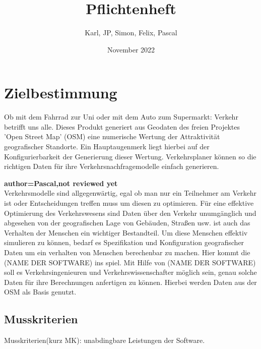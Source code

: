 \documentclass[parskip=full]{scrartcl} %
\title{Pflichtenheft}
\author{Karl, JP, Simon, Felix, Pascal}
\date{November 2022}
\begin{document}
\maketitle
\newpage

\tableofcontents
\newpage




\section{Zielbestimmung}
Ob mit dem Fahrrad zur Uni oder mit dem Auto zum Supermarkt: Verkehr betrifft uns alle. Dieses Produkt generiert aus Geodaten des freien Projektes 'Open Street Map' (OSM) eine numerische Wertung der Attraktivität geografischer Standorte. Ein Hauptaugenmerk liegt hierbei auf der Konfigurierbarkeit der Generierung dieser Wertung. Verkehrsplaner können so die richtigen Daten für ihre Verkehrsnachfragemodelle einfach generieren.


\textbf{author=Pascal,not reviewed yet\\}
Verkehrsmodelle sind allgegenwärtig, egal ob man nur ein Teilnehmer am Verkehr ist oder Entscheidungen treffen muss um diesen zu optimieren.
Für eine effektive Optimierung des Verkehrswesens sind Daten über den Verkehr unumgänglich und abgesehen von der geografischen Lage von Gebäuden, Straßen usw. ist auch das Verhalten der Menschen ein wichtiger Bestandteil.
Um diese Menschen effektiv simulieren zu können, bedarf es Spezifikation und Konfiguration geografischer Daten um ein verhalten von Menschen berechenbar zu machen.
Hier kommt die (NAME DER SOFTWARE) ins spiel.
Mit Hilfe von (NAME DER SOFTWARE) soll es  Verkehrsingenieuren und Verkehrswissenschafter möglich sein, genau solche Daten für ihre Berechnungen anfertigen zu können.
Hierbei werden Daten aus der OSM als Basis genutzt.

\subsection{Musskriterien}
Musskriterien(kurz MK): unabdingbare Leistungen der Software.
\end{document}
